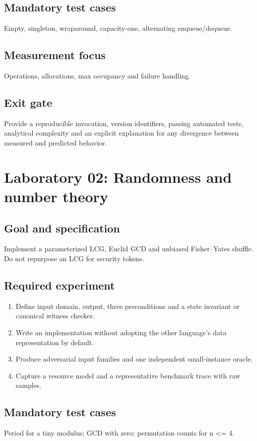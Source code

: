 \documentclass[11pt,letterpaper]{article}
\begin{document}
\subsection{Mandatory test cases}
Empty, singleton, wraparound, capacity-one, alternating enqueue/dequeue.
\subsection{Measurement focus}
Operations, allocations, max occupancy and failure handling.
\subsection{Exit gate}
Provide a reproducible invocation, version identifiers, passing automated tests, analytical complexity and an explicit explanation for any divergence between measured and predicted behavior.

\section{Laboratory 02: Randomness and number theory}
\subsection{Goal and specification}
Implement a parameterized LCG, Euclid GCD and unbiased Fisher--Yates shuffle. Do not repurpose an LCG for security tokens.
\subsection{Required experiment}
\begin{enumerate}
\item Define input domain, output, three preconditions and a state invariant or canonical witness checker.
\item Write an implementation without adopting the other language's data representation by default.
\item Produce adversarial input families and one independent small-instance oracle.
\item Capture a resource model and a representative benchmark trace with raw samples.
\end{enumerate}
\subsection{Mandatory test cases}
Period for a tiny modulus; GCD with zero; permutation counts for n <= 4.
\end{document}
